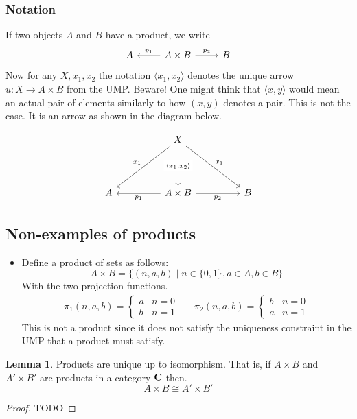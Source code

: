 \documentclass{book}
\theoremstyle{definition}
\newtheorem{lemma}{Lemma}
\begin{document}
\subsubsection{Notation}

If two objects $A$ and $B$ have a product, we write
\[
  \begin{tikzcd}
    A & A \times B \arrow[l, "p_1"'] \arrow[r, "p_2"] & B
  \end{tikzcd}
\]
Now for any $X, x_{1}, x_{2}$ the notation $\langle x_1, x_2 \rangle$ denotes the unique
arrow $u : X \to A \times B$ from the UMP. Beware! One might think that
$\langle x, y \rangle$ would mean an actual pair of elements similarly to how
$(x, y)$ denotes a pair. This is not the case. It is an arrow as shown in the
diagram below.

\[
  \begin{tikzcd}[row sep = 4.2em, column sep = 4.6em]
    & X \arrow[ld, "x_1"'] \arrow[d, dashrightarrow, "{\langle x_1, x_2 \rangle}" description] \arrow[rd, "x_1"] \\
    A & A \times B \arrow[l, "p_1"] \arrow[r, "p_2"'] & B
  \end{tikzcd}
\]

\subsection{Non-examples of products}

\begin{itemize}
\item Define a product of sets as follows:
  \[ A \times B = \{ (n, a, b) \mid n \in \{ 0, 1 \}, a \in A, b \in B \}\]
  With the two projection functions.
  \begin{align*}
    \pi_1(n, a, b) = \begin{cases} a & n = 0 \\ b & n = 1 \end{cases} &&
    \pi_2(n, a, b) = \begin{cases} b & n = 0 \\ a & n = 1 \end{cases}
  \end{align*}
  This is not a product since it does not satisfy the uniqueness constraint in
  the UMP that a product must satisfy.
\end{itemize}

\begin{lemma}
  Products are unique up to isomorphism. That is, if $A \times B$ and $A' \times
  B'$ are products in a category $\bf{C}$ then.
  $$
  A \times B \cong A' \times B'
  $$
\end{lemma}
\begin{proof}
  TODO
\end{proof}
\end{document}
